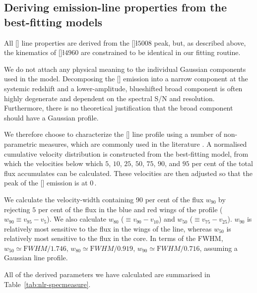 \subsection{Deriving emission-line properties from the best-fitting models}

All [] line properties are derived from the []\l$5008$ peak, but, as described above, the kinematics of []\l$4960$ are constrained to be identical in our fitting routine. 

We do not attach any physical meaning to the individual Gaussian components used in the model. 
Decomposing the [] emission into a narrow component at the systemic redshift and a lower-amplitude, blueshifted broad component is often highly degenerate and dependent on the spectral S/N and resolution. 
Furthermore, there is no theoretical justification that the broad component should have a Gaussian profile.  

We therefore choose to characterize the [] line profile using a number of non-parametric measures, which are commonly used in the literature \citep[e.g.][]{whittle85,zakamska14,zakamska16}. 
A normalised cumulative velocity distribution is constructed from the best-fitting model, from which the velocities below which $5$, $10$, $25$, $50$, $75$, $90$, and $95$ per cent of the total flux accumulates can be calculated. 
These velocities are then adjusted so that the peak of the [] emission is at $0$\,\kms. 

We calculate the velocity-width containing $90$ per cent of the flux $w_{90}$ by rejecting $5$ per cent of the flux in the blue and red wings of the profile ($w_{90}\equiv v_{95} - v_{5}$).
We also calculate $w_{80}$ ($\equiv v_{90} - v_{10}$) and $w_{50}$ ($\equiv v_{75} - v_{25}$).
$w_{90}$ is relatively most sensitive to the flux in the wings of the line, whereas $w_{50}$ is relatively most sensitive to the flux in the core.  
In terms of the FWHM, $w_{50} \simeq {\mathrm FWHM} / 1.746$, $w_{80} \simeq {\mathrm FWHM} / 0.919$, $w_{90} \simeq {\mathrm FWHM} / 0.716$, assuming a Gaussian line profile.  

All of the derived parameters we have calculated are summarised in Table~\ref{tab:nlr-specmeasure}. 

